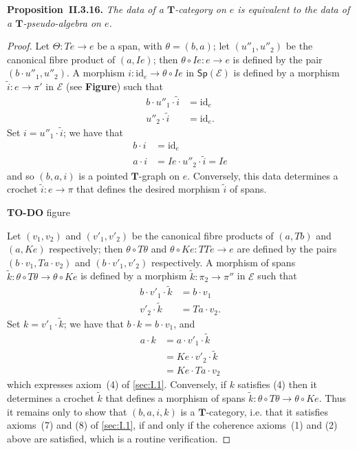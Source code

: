 \documentclass[fleqn]{article}
\newenvironment{itenv}[1]
  {\phantomsection\par\medskip\noindent\textbf{#1.}\itshape}
  {\par\medskip}
\newcommand{\oldpage}[1]{\marginpar{\footnotesize$\Big\vert$ \textit{p.~#1}}}
\newcommand{\todo}{{\color{purple}\textbf{TO-DO }}}
\newcommand{\unsure}[1]{{\color{purple}\textbf{#1}}}
\newcommand{\id}{\mathrm{id}}
\newcommand{\TT}{\mathbf{T}}
\newcommand{\cat}[1]{\mathcal{#1}}
\newcommand{\Cat}[1]{\mathsf{#1}}
\newcommand{\Sp}[1]{\Cat{Sp}(#1)}
\begin{document}
\begin{itenv}{Proposition~II.3.16}
  The data of a $\TT$-category on $e$ is equivalent to the data of a $\TT$-pseudo-algebra on $e$.
\end{itenv}

\begin{proof}
  Let $\Theta\colon Te\to e$ be a span, with $\theta=(b,a)$;
  let $(u''_1,u''_2)$ be the canonical fibre product of $(a,Ie)$;
  then $\theta\circ Ie\colon e\to e$ is defined by the pair $(b\cdot u''_1,u''_2)$.
  A morphism $i\colon\id_e\to\theta\circ Ie$ in $\Sp{\cat{E}}$ is defined by a morphism $\tilde{i}\colon e\to\pi'$ in $\cat{E}$ (see \unsure{Figure}) such that
  \[
    \begin{aligned}
      b\cdot u''_1\cdot\tilde{i}
      &= \id_e
    \\u''_2\cdot\tilde{i}
      &= \id_e.
    \end{aligned}
  \]
  Set $i=u''_1\cdot\tilde{i}$;
  we have that
  \[
    \begin{aligned}
      b\cdot i
      &= \id_e
    \\a\cdot i
      &= Ie\cdot u''_2\cdot\tilde{i}
      = Ie
    \end{aligned}
  \]
  and so $(b,a,i)$ is a pointed $\TT$-graph on $e$.
  Conversely, this data determines a crochet $\tilde{i}\colon e\to\pi$ that defines the desired morphism $\tilde{i}$ of spans.

  \todo{figure}

  \oldpage{261}
  Let $(v_1,v_2)$ and $(v'_1,v'_2)$ be the canonical fibre products of $(a,Tb)$ and $(a,Ke)$ respectively;
  then $\theta\circ T\theta$ and $\theta\circ Ke\colon TTe\to e$ are defined by the pairs $(b\cdot v_1,Ta\cdot v_2)$ and $(b\cdot v'_1,v'_2)$ respectively.
  A morphism of spans $\tilde{k}\colon\theta\circ T\theta\to\theta\circ Ke$ is defined by a morphism $\tilde{k}\colon\pi_2\to\pi''$ in $\cat{E}$ such that
  \[
    \begin{aligned}
      b\cdot v'_1\cdot\tilde{k}
      &= b\cdot v_1
    \\v'_2\cdot\tilde{k}
      &= Ta\cdot v_2.
    \end{aligned}
  \]
  Set $k=v'_1\cdot\tilde{k}$;
  we have that $b\cdot k=b\cdot v_1$, and
  \[
    \begin{aligned}
      a\cdot k
      &= a\cdot v'_1\cdot\tilde{k}
    \\&= Ke\cdot v'_2\cdot\tilde{k}
    \\&= Ke\cdot Ta\cdot v_2
    \end{aligned}
  \]
  which expresses axiom~(4) of \cref{sec:I.1}.
  Conversely, if $k$ satisfies (4) then it determines a crochet $\tilde{k}$ that defines a morphism of spans $\tilde{k}\colon\theta\circ T\theta\to\theta\circ Ke$.
  Thus it remains only to show that $(b,a,i,k)$ is a $\TT$-category, i.e. that it satisfies axioms~(7) and (8) of \cref{sec:I.1}, if and only if the coherence axioms~(1) and (2) above are satisfied, which is a routine verification.
\end{proof}
\end{document}

